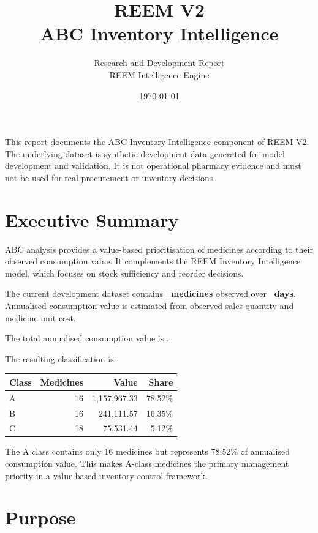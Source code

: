 \documentclass[12pt]{article}
\title{ \textcolor{titleColor}{ \Huge\bfseries REEM V2\\[0.3cm] ABC Inventory Intelligence }}
\author{ Research and Development Report\\ REEM Intelligence Engine }
\date{\today}
\begin{document}
\maketitle

\begin{tcolorbox}[
    colback=titleColor!5,
    colframe=titleColor,
    title=\textbf{Development Status},
    breakable
]
This report documents the ABC Inventory Intelligence component of REEM V2.
The underlying dataset is synthetic development data generated for model
development and validation. It is not operational pharmacy evidence and must
not be used for real procurement or inventory decisions.
\end{tcolorbox}

\newpage

\section{Executive Summary}

ABC analysis provides a value-based prioritisation of medicines according to
their observed consumption value. It complements the REEM Inventory
Intelligence model, which focuses on stock sufficiency and reorder decisions.

The current development dataset contains
\textbf{\ABCTotalMedicines\ medicines} observed over
\textbf{\ABCObservationDays\ days}. Annualised consumption value is estimated
from observed sales quantity and medicine unit cost.

The total annualised consumption value is
\textbf{\ABCTotalValue}.

The resulting classification is:

\begin{center}
\begin{tabular}{lrrr}
\toprule
Class & Medicines & Value & Share\\
\midrule
A & 16 & 1,157,967.33 & 78.52\%\\
B & 16 & 241,111.57 & 16.35\%\\
C & 18 & 75,531.44 & 5.12\%\\
\bottomrule
\end{tabular}
\end{center}

The A class contains only 16 medicines but represents 78.52\% of annualised consumption value.  This makes A-class medicines the primary management priority in a value-based inventory control framework.

\section{Purpose}
\end{document}
